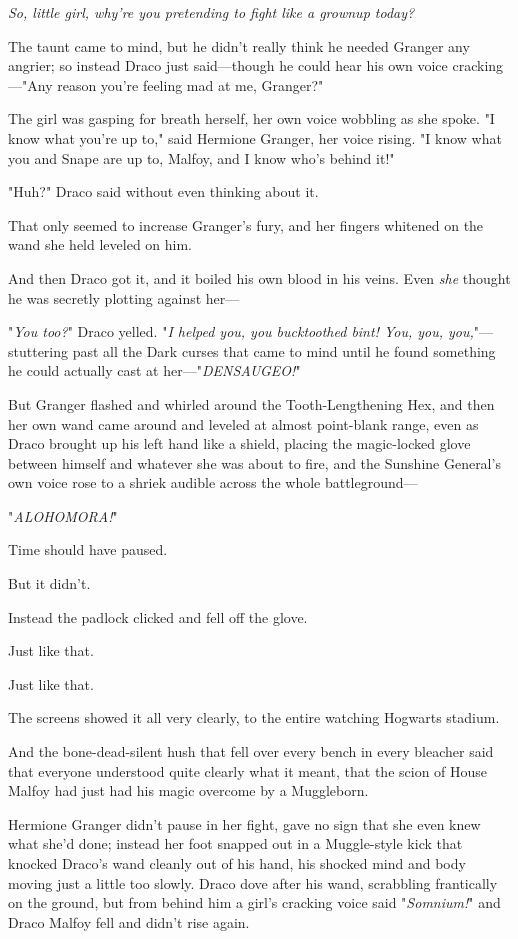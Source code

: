 \emph{So, little girl, why're you pretending to fight like a grownup today?}

The taunt came to mind, but he didn't really think he needed Granger any
angrier; so instead Draco just said—though he could hear his own voice
cracking—"Any reason you're feeling mad at me, Granger?"

The girl was gasping for breath herself, her own voice wobbling as she spoke.
"I know what you're up to," said Hermione Granger, her voice rising. "I know
what you and Snape are up to, Malfoy, and I know who's behind it!"

"Huh?" Draco said without even thinking about it.

That only seemed to increase Granger's fury, and her fingers whitened on the
wand she held leveled on him.

And then Draco got it, and it boiled his own blood in his veins. Even
\emph{she} thought he was secretly plotting against her—

"\emph{You too?}" Draco yelled. "\emph{I helped you, you bucktoothed bint! You,
you, you,}"— stuttering past all the Dark curses that came to mind until he
found something he could actually cast at her—"\emph{DENSAUGEO!}"

But Granger flashed and whirled around the Tooth-Lengthening Hex, and then her
own wand came around and leveled at almost point-blank range, even as Draco
brought up his left hand like a shield, placing the magic-locked glove between
himself and whatever she was about to fire, and the Sunshine General's own
voice rose to a shriek audible across the whole battleground—

"\emph{ALOHOMORA!}"

Time should have paused.

But it didn't.

Instead the padlock clicked and fell off the glove.

Just like that.

Just like that.

The screens showed it all very clearly, to the entire watching Hogwarts stadium.

And the bone-dead-silent hush that fell over every bench in every bleacher said
that everyone understood quite clearly what it meant, that the scion of House
Malfoy had just had his magic overcome by a Muggleborn.

Hermione Granger didn't pause in her fight, gave no sign that she even knew
what she'd done; instead her foot snapped out in a Muggle-style kick that
knocked Draco's wand cleanly out of his hand, his shocked mind and body moving
just a little too slowly. Draco dove after his wand, scrabbling frantically on
the ground, but from behind him a girl's cracking voice said "\emph{Somnium!}"
and Draco Malfoy fell and didn't rise again.

